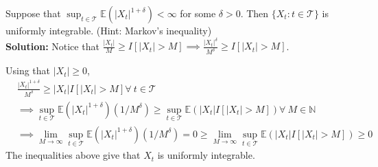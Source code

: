 \documentclass[11pt,letterpaper]{article}                  %
\begin{document}
\bigskip
\begin{problem}

\end{problem}

\bigskip
\begin{problem}
Suppose that $\sup_{t \in \mathcal{T}} \mathbb{E}(|X_t|^{1+\delta}) < \infty$ for some $\delta >0$. Then $\{X_t : t \in \mathcal{T}\}$ is uniformly integrable. (Hint: Markov's inequality) \\

\textbf{Solution:} Notice that $\frac{|X_t|}{M} \geq I[|X_t|>M] \implies \frac{|X_t|^{\delta}}{M^{\delta}} \geq I[|X_t|>M]$. 

Using that $|X_t|\geq 0$,
\begin{align*}
&\frac{|X_t|^{1+\delta}}{M^{\delta}}\geq |X_t| I[|X_t|>M] \forall \ t \in \mathcal{T}\\
&\implies \sup_{t \in \mathcal{T}} \mathbb{E}(|X_t|^{1+\delta}) (1/M^{\delta}) \geq \sup_{t \in \mathcal{T}} \mathbb{E}(|X_t|I[|X_t|>M]) \forall \ M \in \mathbb{N} \\
&\implies \lim_{M \to \infty} \sup_{t \in \mathcal{T}} \mathbb{E}(|X_t|^{1+\delta}) (1/M^{\delta}) = 0 \geq \lim_{M \to \infty} \sup_{t \in \mathcal{T}} \mathbb{E}(|X_t|I[|X_t|>M]) \geq 0
\end{align*}
The inequalities above give that $X_t$ is uniformly integrable.
\end{problem}

\bigskip

\begin{problem}

\end{problem}

\bigskip
\end{document}
